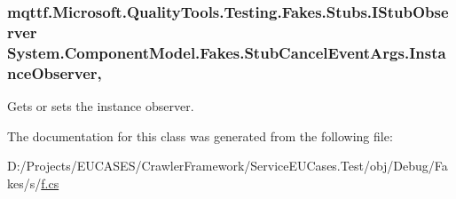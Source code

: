 \hypertarget{class_system_1_1_component_model_1_1_fakes_1_1_stub_cancel_event_args_a04520de7af13af15c4e4170b23c93f5b}{
\subsubsection[{Instance\-Observer}]{\setlength{\rightskip}{0pt plus 5cm}mqttf.\-Microsoft.\-Quality\-Tools.\-Testing.\-Fakes.\-Stubs.\-I\-Stub\-Observer System.\-Component\-Model.\-Fakes.\-Stub\-Cancel\-Event\-Args.\-Instance\-Observer\hspace{0.3cm}{\ttfamily [get]}, {\ttfamily [set]}}}\label{class_system_1_1_component_model_1_1_fakes_1_1_stub_cancel_event_args_a04520de7af13af15c4e4170b23c93f5b}


Gets or sets the instance observer.



The documentation for this class was generated from the following file\-:\begin{DoxyCompactItemize}
\item 
D\-:/\-Projects/\-E\-U\-C\-A\-S\-E\-S/\-Crawler\-Framework/\-Service\-E\-U\-Cases.\-Test/obj/\-Debug/\-Fakes/s/\hyperlink{s_2f_8cs}{f.\-cs}\end{DoxyCompactItemize}
